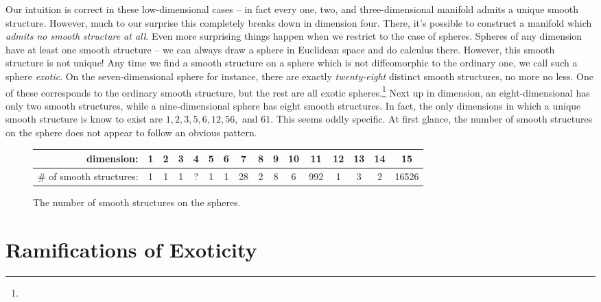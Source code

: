 Our intuition is correct in these low-dimensional cases -- in fact every one, two, and three-dimensional manifold admits a unique smooth structure. However, much to our surprise this completely breaks down in dimension four. There, it's possible to construct a manifold which \emph{admits no smooth structure at all}. Even more surprising things happen when we restrict to the case of spheres. Spheres of any dimension have at least one smooth structure -- we can always draw a sphere in Euclidean space and do calculus there. However, this smooth structure is not unique!
Any time we find a smooth structure on a sphere which is not diffeomorphic to the ordinary one, we call such a sphere \emph{exotic}.
On the seven-dimensional sphere for instance, there are exactly \emph{twenty-eight} distinct smooth structures, no more no less.
One of these corresponds to the ordinary smooth structure, but the rest are all exotic spheres.\footnote{}
Next up in dimension, an eight-dimensional has only two smooth structures, while a nine-dimensional sphere has eight smooth structures. In fact, the only dimensions in which a unique smooth structure is know to exist are $1,2,3,5,6,12,56,$ and $61$. This seems oddly specific.
At first glance, the number of smooth structures on the sphere does not appear to follow an obvious pattern.
\begin{figure}[ht]
	\renewcommand{\arraystretch}{1.2}
	\centering
	\begin{tabular}{r|c|c|c|c|c|c|c|c|c|c|c|c|c|c|c}
		\textrm{dimension:}               & 1 & 2 & 3 & 4 & 5 & 6 & 7  & 8 & 9 & 10 & 11  & 12 & 13 & 14 & 15    \\
		\hline
		\textrm{\# of smooth structures:} & 1 & 1 & 1 & ? & 1 & 1 & 28 & 2 & 8 & 6  & 992 & 1  & 3  & 2  & 16526 \\
	\end{tabular}
	\medskip
	\caption{The number of smooth structures on the spheres.}
\end{figure}


\section*{Ramifications of Exoticity}

